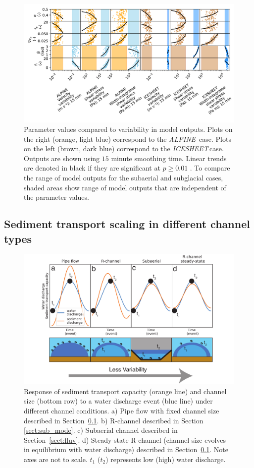 \documentclass[tc, manuscript]{copernicus}
\newcommand{\alpine}{\textit{ALPINE}\,}
\newcommand{\icesheet}{\textit{ICESHEET}\,}
\begin{document}
\begin{figure}[hbt!]
  \centering
  \includegraphics[width=0.7\linewidth]{Fig5.pdf}
  \caption{Parameter values compared to variability in model outputs.
    Plots on the right (orange, light blue) correspond to the \alpine{} case. Plots on the left (brown, dark blue) correspond to the \icesheet case.
    Outputs are shown using $15$ minute smoothing time.
    Linear trends are denoted in black if they are significant at  $p\ge0.01$ .
    To compare the range of model outputs for the subaerial and subglacial cases, shaded areas show range of model outputs that are independent of the parameter values. 
  }
  \label{fig:params}
\end{figure}

\FloatBarrier
\subsection{Sediment transport scaling in different channel types}
\label{sect:scaling}

\begin{figure}[hbt!]
  \centering
  \includegraphics[width=0.7\linewidth]{Fig6.pdf}
  \caption{Response of sediment transport capacity (orange line) and channel size (bottom row) to a water discharge event (blue line) under different channel conditions.
    a) Pipe flow with fixed channel size described in Section~\ref{sect:scaling}.
    b) R-channel described in Section \ref{sect:sub_mode}.
    c) Subaerial channel described in Section~\ref{sect:fluv}.
    d) Steady-state R-channel (channel size evolves in equilibrium with water discharge) described in Section~\ref{sect:scaling}.
    Note axes are not to scale.
    $t_1$ ($t_2$) represents low (high) water discharge. 
  }
  \label{fig:chan_types}
\end{figure}
\end{document}

